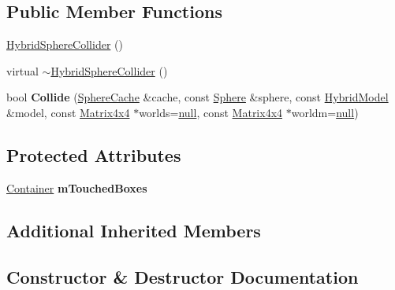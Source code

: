\subsection*{Public Member Functions}
\begin{DoxyCompactItemize}
\item 
\hyperlink{classOpcode_1_1HybridSphereCollider_a503c9df2597a80a88b7882e26916ebbd}{Hybrid\+Sphere\+Collider} ()
\item 
virtual \hyperlink{classOpcode_1_1HybridSphereCollider_a1df97d0aecf6953da20ba22ba85a236b}{$\sim$\+Hybrid\+Sphere\+Collider} ()
\item 
bool {\bfseries Collide} (\hyperlink{structOpcode_1_1SphereCache}{Sphere\+Cache} \&cache, const \hyperlink{classOpcode_1_1Sphere}{Sphere} \&sphere, const \hyperlink{classOpcode_1_1HybridModel}{Hybrid\+Model} \&model, const \hyperlink{classOpcode_1_1Matrix4x4}{Matrix4x4} $\ast$worlds=\hyperlink{IceTypes_8h_ac97b8ee753e4405397a42ad5799b0f9e}{null}, const \hyperlink{classOpcode_1_1Matrix4x4}{Matrix4x4} $\ast$worldm=\hyperlink{IceTypes_8h_ac97b8ee753e4405397a42ad5799b0f9e}{null})\hypertarget{classOpcode_1_1HybridSphereCollider_ae7b7c5befe93b1cef898b2f75746edbe}{}\label{classOpcode_1_1HybridSphereCollider_ae7b7c5befe93b1cef898b2f75746edbe}

\end{DoxyCompactItemize}
\subsection*{Protected Attributes}
\begin{DoxyCompactItemize}
\item 
\hyperlink{classContainer}{Container} {\bfseries m\+Touched\+Boxes}\hypertarget{classOpcode_1_1HybridSphereCollider_a4b5b9c5d419ba98cde8a2ef347c8db57}{}\label{classOpcode_1_1HybridSphereCollider_a4b5b9c5d419ba98cde8a2ef347c8db57}

\end{DoxyCompactItemize}
\subsection*{Additional Inherited Members}


\subsection{Constructor \& Destructor Documentation}
